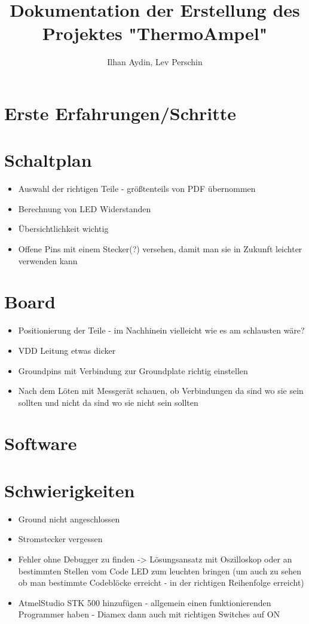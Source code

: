 \documentclass[]{article}
\title{Dokumentation der Erstellung des Projektes "ThermoAmpel"}
\author{Ilhan Aydin, Lev Perschin}
\begin{document}
\maketitle
\newpage
\begin{abstract}

\end{abstract}
\newpage
\section{Erste Erfahrungen/Schritte}
\section{Schaltplan}
\begin{itemize}
	\item Auswahl der richtigen Teile - größtenteils von PDF übernommen
	\item Berechnung von LED Widerstanden
	\item Übersichtlichkeit wichtig
	\item Offene Pins mit einem Stecker(?) versehen, damit man sie in Zukunft leichter verwenden kann
\end{itemize}
\section{Board}
\begin{itemize}
	\item Positionierung der Teile - im Nachhinein vielleicht wie es am schlausten wäre?
	\item VDD Leitung etwas dicker
	\item Groundpins mit Verbindung zur Groundplate richtig einstellen
	\item Nach dem Löten mit Messgerät schauen, ob Verbindungen da sind wo sie sein sollten und nicht da sind wo sie nicht sein sollten
\end{itemize}
\section{Software}
	
\section{Schwierigkeiten}
\begin{itemize}
	\item Ground nicht angeschlossen
	\item Stromstecker vergessen
	\item Fehler ohne Debugger zu finden -> Lösungsansatz mit Oszilloskop oder an bestimmten Stellen vom Code LED zum leuchten bringen (um auch zu sehen ob man bestimmte Codeblöcke erreicht - in der richtigen Reihenfolge erreicht)
	\item AtmelStudio STK 500 hinzufügen - allgemein einen funktionierenden Programmer haben - Diamex dann auch mit richtigen Switches auf ON 
\end{itemize}
\end{document}

